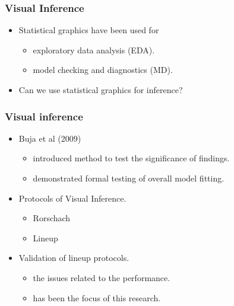 \documentclass{beamer}
\begin{document}
%  



\begin{frame}
  \frametitle{Visual Inference}
		  \begin{itemize}
			  \item Statistical graphics have been used for
			     \begin{itemize}
			        \item exploratory data analysis (EDA).
			        \item model checking and diagnostics (MD).
           \end{itemize}				  
			  \item Can we use statistical graphics for inference?
		  \end{itemize}			
\end{frame}


\begin{frame}
\frametitle{Visual inference}
  \begin{itemize}
    \item Buja et al (2009)
		  \begin{itemize}
			  \item introduced method to test the significance of findings.
			  \item demonstrated formal testing of overall model fitting.
		  \end{itemize}
		\item Protocols of Visual Inference.
		  \begin{itemize}
			  \item Rorschach
			  \item Lineup
		  \end{itemize}		
		\item Validation of lineup protocols. 
		  \begin{itemize}
			  \item the issues related to the performance.
			  \item has been the focus of this research.
		  \end{itemize}			
  \end{itemize}		  
\end{frame}
\end{document}
